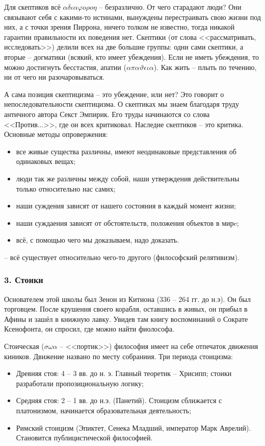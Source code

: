 \documentclass[a4paper, 12pt]{article} %
\begin{document}
Для скептиков всё $\alpha \delta \iota \alpha \varphi o \rho o \eta$ -- безразлично. От чего старадают люди? Они связывают себя с какими-то истинами, вынуждены перестраивать свою жизни под  них, а с точки зрения Пиррона, ничего толком не известно, тогда никакой гарантии правильности их поведения нет. Скептики (от слова <<рассматривать, исследовать>>) делили всех на две большие группы: одни сами скептики, а вторые -- догматики (всякий, кто имеет убеждения). Если не иметь убеждения, то можно достигнуть бесстастия, апатии ($\alpha \pi \alpha \vartheta \epsilon \iota \alpha$). Как жить -- плыть по течению, ни от чего ни разочаровываться. 

А сама позиция скептицизма -- это убеждение, или нет? Это говорит о непоследовательности скептицизма. О скептиках мы знаем благодаря труду античного автора Секст Эмпирик. Его труды начинаются со слова <<Против...>>, где он всех критиковал. Наследие скептиков -- это критика. Основные методы опровержения:
\begin{itemize}
\item  все живые существа различны, имеют неодинаковые представления об одинаковых вещах;
\item люди так же различны между собой, наши утверждения действительны только относительно нас самих;
\item наши суждения зависят от нашего состояния в каждый момент жизни;
\item наши суждаения зависят от обстоятельств, положения объектов в мирe;
\item всё, с помощью чего мы доказываем, надо доказать.
\end{itemize}
-- всё существует относительно чего-то другого (философский релятивизм).

\subsubsection*{3. Стоики}
Основателем этой школы был Зенон из Китиона (336 -- 264 гг. до н.э). Он был торговцем. После крушения своего корабля, оставшись в живых, он прибыл в Афины и зашёл в книжную лавку. Увидев там книгу воспоминаний о Сократе Ксенофонта, он спросил, где можно найти фиолософа.

Стоическая ($\sigma\omega\alpha$ -- <<портик>>) философия имеет на себе отпечаток движения киников. Движение названо по месту собраниия.
Три периода стоицизма:
\begin{itemize}
\item Древняя стоя: 4 -- 3 вв. до н. э. Главный теоретик -- Хрисипп; стоики разработали пропозициональную логику;
\item  Средняя стоя: 2 -- 1 вв. до н.э. (Панетий). Стоицизм сближается с платонизмом, начинается образовательная деятельность;
\item Римский стоицизм (Эпиктет, Сенека Младший, император Марк Аврелий). Становится публицистической философией.
\end{itemize}
\end{document}
